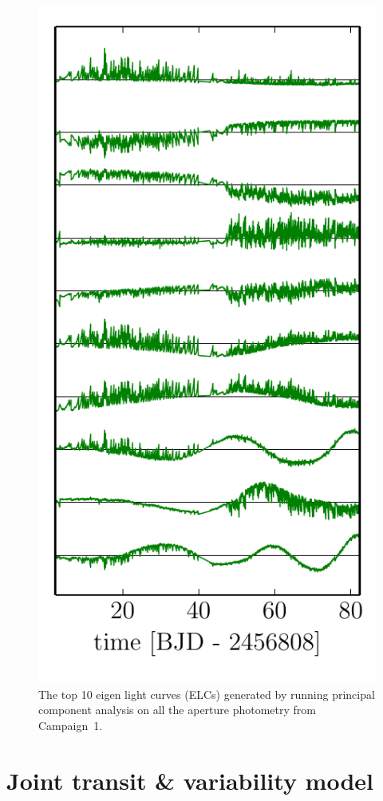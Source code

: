 \begin{figure}[p]
\begin{center}
\includegraphics{figures/ketu/pca.pdf}
\end{center}
\caption{%
The top 10 eigen light curves (ELCs) generated by running principal component
analysis on all the aperture photometry from Campaign~1.
}
\end{figure}


\section{Joint transit \& variability model}

